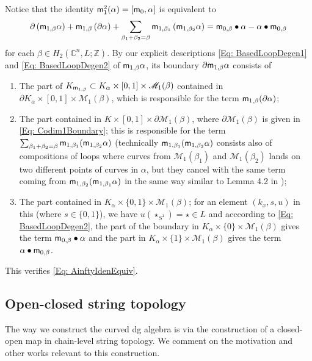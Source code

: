 \documentclass[10pt]{amsart}
\numberwithin{equation}{section}
\theoremstyle{plain}
\theoremstyle{definition}
\theoremstyle{remark}
\numberwithin{equation}{section}
\newcommand{\Z}{\mathbb{Z}}
\newcommand{\C}{\mathbb{C}}
\newcommand{\ms}[1]{\mathscr{#1}}
\newcommand{\mm}{\textup{\textsf{m}}}
\begin{document}
{Notice that the identity $\mm_1^2(\alpha)=[\mm_0,\alpha]$ is equivalent to \begin{align}\label{Eq: AinftyIdenEquiv}
	\partial\left(\mm_{1,\beta} \alpha\right) + \mm_{1,\beta}\left(\partial \alpha\right) + \sum_{\beta_1+\beta_2=\beta}\mm_{1,\beta_1}\left(\mm_{1,\beta_2} \alpha\right) = \mm_{0,\beta} \bullet \alpha  - \alpha \bullet \mm_{0,\beta}
\end{align}
for each $\beta\in H_2(\C^n,L;\Z)$.
By our explicit descriptions \eqref{Eq: BasedLoopDegen1} and \eqref{Eq: BasedLoopDegen2} of $\mm_{1,\beta}\alpha$, its boundary $\partial\mm_{1,\beta}\alpha$ consists of 
\begin{enumerate}
	\item The part of $K_{\mm_{1,\beta}}\subset K_\alpha \times [0,1] \times \ms{M}_1(\beta)$ contained in $\partial K_\alpha \times [0,1]\times \ms{M}_1(\beta)$, which is responsible for the term $\mm_{1,\beta}(\partial \alpha)$;
	\item The part contained in $K\times [0,1] \times \partial \ms{M}_1(\beta)$, where $\partial \ms{M}_1(\beta)$ is given in \eqref{Eq: Codim1Boundary}; this is responsible for the term $\sum_{\beta_1+\beta_2=\beta} \mm_{1,\beta_1}(\mm_{1,\beta_2}\alpha)$ (technically $\mm_{1,\beta_1}(\mm_{1,\beta_2}\alpha)$ consists also of compositions of loops where curves from $\ms{M}_1(\beta_1)$ and $\ms{M}_1(\beta_2)$ lands on two different points of curves in $\alpha$, but they cancel with the same term coming from $\mm_{1,\beta_2}(\mm_{1,\beta_1}\alpha)$ in the same way similar to Lemma 4.2 in \cite{ChasSullivan});
	\item The part contained in $K_\alpha \times \{0,1\} \times \ms{M}_1(\beta)$; for an element $(k_x, s, u)$ in this (where $s\in \{0,1\}$), we have $u(\star_{S^1}) = \star \in L$ and acccording to \eqref{Eq: BasedLoopDegen2}, the part of the boundary in  $K_\alpha \times \{0\}\times \ms{M}_1(\beta)$ gives the term $\mm_{0,\beta}\bullet \alpha$ and the part in $K_\alpha \times \{1\}\times \ms{M}_1(\beta)$  gives the term $\alpha \bullet \mm_{0,\beta}$.
\end{enumerate}

This verifies \eqref{Eq: AinftyIdenEquiv}.


\subsection{Open-closed string topology}\label{Subsc: OCStringSurvey}
The way we construct the curved dg algebra is via the construction of a closed-open map in chain-level string topology. We comment on the motivation and other works relevant to this construction.

}
\end{document}
